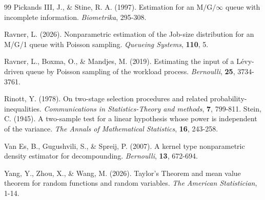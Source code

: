 \documentclass[12pt]{article}
\newcommand{\1}{\mathbf{1}}
\begin{document}
\begin{thebibliography}{99}
Pickands III, J., \& Stine, R. A. (1997). Estimation for an $\text{M/G/}\infty$ queue with incomplete information. \textit{Biometrika}, 295-308.

Ravner, L. (2026). Nonparametric estimation of the Job-size distribution for an M/G/1 queue with Poisson sampling. \textit{Queueing Systems}, \textbf{110}, 5.

Ravner, L., Boxma, O., \& Mandjes, M. (2019). Estimating the input of a L\'evy-driven queue by Poisson sampling of the workload process. \textit{Bernoulli}, \textbf{25}, 3734-3761.

 Rinott, Y. (1978). On two-stage selection procedures and related probability-inequalities. \textit{Communications in Statistics-Theory and methods}, \textbf{7}, 799-811.
Stein, C. (1945). A two-sample test for a linear hypothesis whose power is independent of the variance. \textit{The Annals of Mathematical Statistics}, \textbf{16}, 243-258.

Van Es, B., Gugushvili, S., \& Spreij, P. (2007). A kernel type nonparametric density estimator for decompounding. \textit{Bernoulli}, \textbf{13}, 672-694.

Yang, Y., Zhou, X., \& Wang, M. (2026). Taylor’s Theorem and mean value theorem for random functions and random variables. \textit{The American Statistician}, 1-14.

\end{thebibliography}
\end{document}

